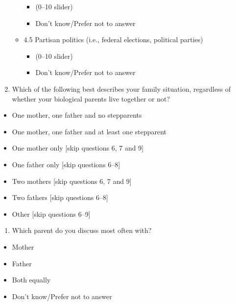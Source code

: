 \documentclass[
  letterpaper,
  DIV=11,
  numbers=noendperiod]{scrreprt}
\providecommand{\tightlist}{%
  \setlength{\itemsep}{0pt}\setlength{\parskip}{0pt}}\usepackage{longtable,booktabs,array}
\begin{document}
\begin{enumerate}
\begin{itemize}
    \begin{itemize}
    \tightlist
    \item
      (0--10 slider)
    \item
      Don't know/Prefer not to answer
    \end{itemize}
  \item
    4.5 Partisan politics (i.e., federal elections, political parties)

    \begin{itemize}
    \tightlist
    \item
      (0--10 slider)
    \item
      Don't know/Prefer not to answer
    \end{itemize}
  \end{itemize}
\item
  Which of the following best describes your family situation,
  regardless of whether your biological parents live together or not?
\end{enumerate}

\begin{itemize}
\tightlist
\item
  One mother, one father and no stepparents
\item
  One mother, one father and at least one stepparent
\item
  One mother only {[}skip questions 6, 7 and 9{]}
\item
  One father only {[}skip questions 6--8{]}
\item
  Two mothers {[}skip questions 6, 7 and 9{]}
\item
  Two fathers {[}skip questions 6--8{]}
\item
  Other {[}skip questions 6--9{]}
\end{itemize}

\begin{enumerate}
\def\labelenumi{\arabic{enumi}.}
\setcounter{enumi}{5}
\tightlist
\item
  Which parent do you discuss most often with?
\end{enumerate}

\begin{itemize}
\tightlist
\item
  Mother
\item
  Father
\item
  Both equally
\item
  Don't know/Prefer not to answer
\end{itemize}
\end{document}
